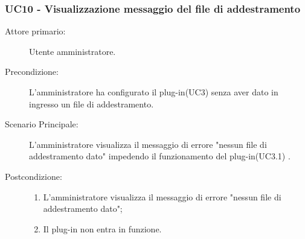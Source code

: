 \subsubsection{UC10 - Visualizzazione messaggio del file di addestramento}
\label{sssec:uc10}
\begin{description}
	\item[Attore primario:] Utente amministratore.
	\item[Precondizione:] L'amministratore ha configurato il plug-in(UC3) senza aver dato in ingresso un file di addestramento.
	\item[Scenario Principale:] L'amministratore visualizza il messaggio di errore "nessun file di addestramento dato" impedendo il funzionamento del plug-in(UC3.1) .
	\item[Postcondizione:]
	\begin{enumerate}
		\item L'amministratore visualizza il messaggio di errore "nessun file di addestramento dato";
		\item Il plug-in non entra in funzione.
	\end{enumerate}
\end{description}